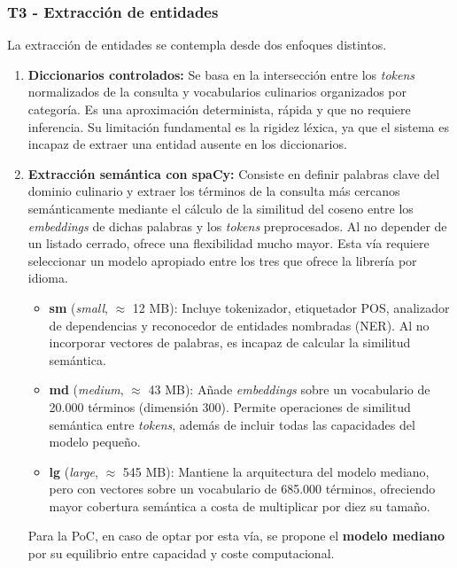 \documentclass[11pt,a4paper,twoside]{article}
\theoremstyle{definition}
\numberwithin{equation}{section}
\begin{document}
\subsubsection*{T3 - Extracción de entidades}
La extracción de entidades se contempla desde dos enfoques distintos.
\begin{enumerate}
	\item \textbf{Diccionarios controlados:} Se basa en la intersección entre los \textit{tokens} normalizados de la consulta y vocabularios culinarios organizados por categoría. Es una aproximación determinista, rápida y que no requiere inferencia. Su limitación fundamental es la rigidez léxica, ya que el sistema es incapaz de extraer una entidad ausente en los diccionarios.
	
	\item \textbf{Extracción semántica con spaCy:} Consiste en definir palabras clave del dominio culinario y extraer los términos de la consulta más cercanos semánticamente mediante el cálculo de la similitud del coseno entre los \textit{embeddings} de dichas palabras y los \textit{tokens} preprocesados. Al no depender de un listado cerrado, ofrece una flexibilidad mucho mayor. Esta vía requiere seleccionar un modelo apropiado entre los tres que ofrece la librería por idioma.
	\begin{itemize}
		\item \textbf{sm} (\textit{small}, $\approx$ 12 MB): Incluye tokenizador, etiquetador POS, analizador de dependencias y reconocedor de entidades nombradas (NER). Al no incorporar vectores de palabras, es incapaz de calcular la similitud semántica.
		\item \textbf{md} (\textit{medium}, $\approx$ 43 MB): Añade \textit{embeddings} sobre un vocabulario de 20.000 términos (dimensión 300). Permite operaciones de similitud semántica entre \textit{tokens}, además de incluir todas las capacidades del modelo pequeño.
		\item \textbf{lg} (\textit{large}, $\approx$ 545 MB): Mantiene la arquitectura del modelo mediano, pero con vectores sobre un vocabulario de 685.000 términos, ofreciendo mayor cobertura semántica a costa de multiplicar por diez su tamaño.
	\end{itemize}
	Para la PoC, en caso de optar por esta vía, se propone el \textbf{modelo mediano} por su equilibrio entre capacidad y coste computacional. 
\end{enumerate}
\end{document}
